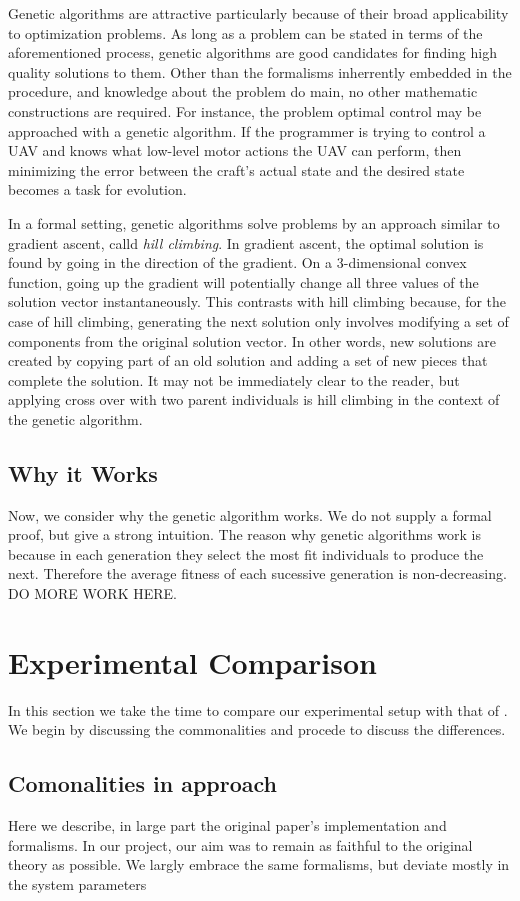 \documentclass[conference]{IEEEtran}
\begin{document}
Genetic algorithms are attractive particularly because of their broad applicability to optimization problems. As long as a problem can be stated in terms of the aforementioned process, genetic algorithms are good candidates for finding high quality solutions to them. Other than the formalisms inherrently embedded in the procedure, and knowledge about the problem do main, no other mathematic constructions are required. For instance, the problem optimal control may be approached with a genetic algorithm. If the programmer is trying to control a UAV and knows what low-level motor actions the UAV can perform, then minimizing the error between the craft's actual state and the desired state becomes a task for evolution. 

In a formal setting, genetic algorithms solve problems by an approach similar to gradient ascent, calld {\it hill climbing}. In gradient ascent, the optimal solution is found by going in the direction of the gradient. On a 3-dimensional convex function, going up the gradient will potentially change all three values of the solution vector instantaneously. This contrasts with hill climbing because, for the case of hill climbing, generating the next solution only involves modifying a set of components from the original solution vector. In other words, new solutions are created by copying part of an old solution and adding a set of new pieces that complete the solution. It may not be immediately clear to the reader, but applying cross over with two parent individuals is hill climbing in the context of the genetic algorithm.

\subsection{Why it Works}
Now, we consider why the genetic algorithm works. We do not supply a formal proof, but give a strong intuition. The reason why genetic algorithms work is because in each generation they select the most fit individuals to produce the next. Therefore the average fitness of each sucessive generation is non-decreasing. DO MORE WORK HERE.
\section{Experimental Comparison}
In this section we take the time to compare our experimental setup with that of \cite{lillywhite2013feature}. We begin by discussing the commonalities and procede to discuss the differences.
\subsection{Comonalities in approach}
Here we describe, in large part the original paper's implementation and formalisms. In our project, our aim was to remain as faithful to the original theory as possible. We largly embrace the same formalisms, but deviate mostly in the system parameters
\end{document}
